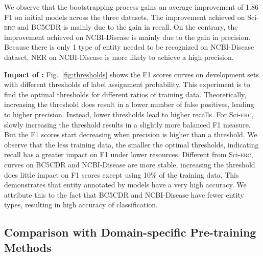 \documentclass[10pt, conference, compsocconf]{IEEEtran}
\newcommand{\Scierc}{\textsc{S}ci-\textsc{erc}\xspace}
\begin{document}
We observe that the bootstrapping process gains an average improvement of 1.86 F1 on initial models across the three datasets. 
The improvement achieved on \Scierc and BC5CDR is mainly due to the gain in recall.
On the contrary, the improvement achieved on NCBI-Disease is mainly due to the gain in precision.
Because there is only 1 type of entity needed to be recognized on NCBI-Disease dataset,
NER on NCBI-Disease is more likely to achieve a high precision.
\begin{figure*}[tb]
    \centering
    \subfigure[\Scierc]{ \texttt{[image: ./figures/SciERC.pdf]}}

\caption{F1 scores curves on development set vs. thresholds of label assignment
    probability.}
    \label{fig:thresholds}
\end{figure*}




\textbf{Impact of :}
Fig.~\ref{fig:thresholds} shows the F1 scores curves on development sets with different thresholds
of label assignment probability. 
This experiment is to find the optimal thresholds
for different ratios of training data.
Theoretically, increasing the threshold does result in a lower number of false positives, leading to 
higher precision. Instead, lower thresholds lead to higher recalls. 
For \Scierc, slowly increasing the threshold results in a slightly more balanced F1 measure.
But the F1 scores start decreasing when precision is higher than a threshold.
We observe that the less training data, the smaller the optimal thresholds, indicating recall 
has a greater impact on F1 under lower resources. Different from \Scierc, curves on BC5CDR and NCBI-Disease are more stable, 
increasing the threshold does little impact on F1 scores except using 10\% of the training data. 
This demonstrates that entity annotated by models have a very high accuracy.
We attribute this to the fact that BC5CDR and NCBI-Disease have fewer entity types,
resulting in high accuracy of classification.

\subsection{Comparison with Domain-specific Pre-training Methods}
\end{document}
